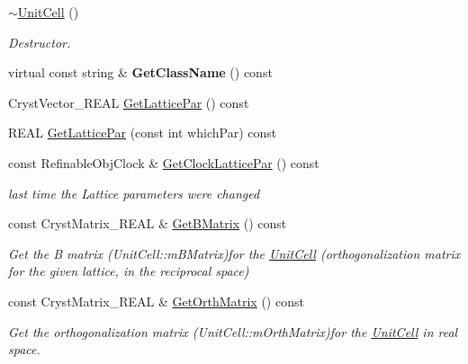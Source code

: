 \begin{DoxyCompactItemize}
\mbox{\hyperlink{class_obj_cryst_1_1_unit_cell_aab63f4f8527568531f015721a48b6da5}{$\sim$\+Unit\+Cell}} ()
\begin{DoxyCompactList}\small\item\em Destructor. \end{DoxyCompactList}\item 
\mbox{\label{class_obj_cryst_1_1_unit_cell_a9d942676f2f5b7cb37fcdf82ac411fbf}} 
virtual const string \& {\bfseries Get\+Class\+Name} () const
\item 
Cryst\+Vector\+\_\+\+R\+E\+AL \mbox{\hyperlink{class_obj_cryst_1_1_unit_cell_a176768bac4762fa188a0e30c255c19fb}{Get\+Lattice\+Par}} () const
\item 
R\+E\+AL \mbox{\hyperlink{class_obj_cryst_1_1_unit_cell_a1f5687e68709cd764f12d4128c8b6492}{Get\+Lattice\+Par}} (const int which\+Par) const
\item 
\mbox{\label{class_obj_cryst_1_1_unit_cell_ad774324f564621a3e7bcd0cfcafae9cc}} 
const Refinable\+Obj\+Clock \& \mbox{\hyperlink{class_obj_cryst_1_1_unit_cell_ad774324f564621a3e7bcd0cfcafae9cc}{Get\+Clock\+Lattice\+Par}} () const
\begin{DoxyCompactList}\small\item\em last time the Lattice parameters were changed \end{DoxyCompactList}\item 
const Cryst\+Matrix\+\_\+\+R\+E\+AL \& \mbox{\hyperlink{class_obj_cryst_1_1_unit_cell_ac0cdfda8a5ebab4ee60f3e55dc37c9a3}{Get\+B\+Matrix}} () const
\begin{DoxyCompactList}\small\item\em Get the \textquotesingle{}B\textquotesingle{} matrix (Unit\+Cell\+::m\+B\+Matrix)for the \mbox{\hyperlink{class_obj_cryst_1_1_unit_cell}{Unit\+Cell}} (orthogonalization matrix for the given lattice, in the reciprocal space) \end{DoxyCompactList}\item 
const Cryst\+Matrix\+\_\+\+R\+E\+AL \& \mbox{\hyperlink{class_obj_cryst_1_1_unit_cell_ab043dec221c1a89228a46157cd4679a2}{Get\+Orth\+Matrix}} () const
\begin{DoxyCompactList}\small\item\em Get the orthogonalization matrix (Unit\+Cell\+::m\+Orth\+Matrix)for the \mbox{\hyperlink{class_obj_cryst_1_1_unit_cell}{Unit\+Cell}} in real space. \end{DoxyCompactList}\item 

\end{DoxyCompactItemize}
